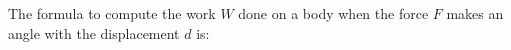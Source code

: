 The formula to compute the work $W$ done on a body when 
the force $F$ makes an angle with the displacement $d$ is: